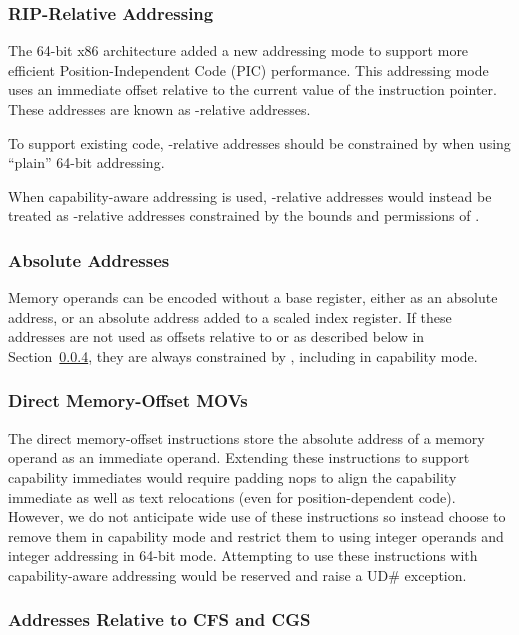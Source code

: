 \subsubsection{RIP-Relative Addressing}

The 64-bit x86 architecture added a new addressing mode to support more
efficient Position-Independent Code (PIC) performance.
This addressing mode uses an immediate offset
relative to the current value of the instruction
pointer.  These addresses are known as \RIP{}-relative addresses.

To support existing code, \RIP{}-relative addresses should be constrained
by \DDC{} when using ``plain'' 64-bit addressing.

When capability-aware addressing is used, \RIP{}-relative addresses
would instead be treated as \CIP{}-relative addresses
constrained by the bounds and permissions of \CIP{}.

\subsubsection{Absolute Addresses}

Memory operands can be encoded without a base register, either as an
absolute address, or an absolute address added to a scaled index
register.  If these addresses are not used as offsets relative to
\CFS{} or \CGS{} as described below in Section~\ref{sec:x86:cfs-cgs},
they are always constrained by
\DDC{}, including in capability mode.

\subsubsection{Direct Memory-Offset MOVs}

The direct memory-offset  instructions store the
absolute address of a memory operand as an immediate operand.
Extending these instructions to support capability immediates would
require padding nops to align the capability immediate as well as text
relocations (even for position-dependent code).  However, we do not
anticipate wide use of these instructions so instead choose to
remove them in capability mode and restrict them to using integer
operands and integer addressing in 64-bit mode.  Attempting to use these instructions
with capability-aware addressing would be reserved and raise a UD\#
exception.

\subsubsection{Addresses Relative to CFS and CGS}
\label{sec:x86:cfs-cgs}


